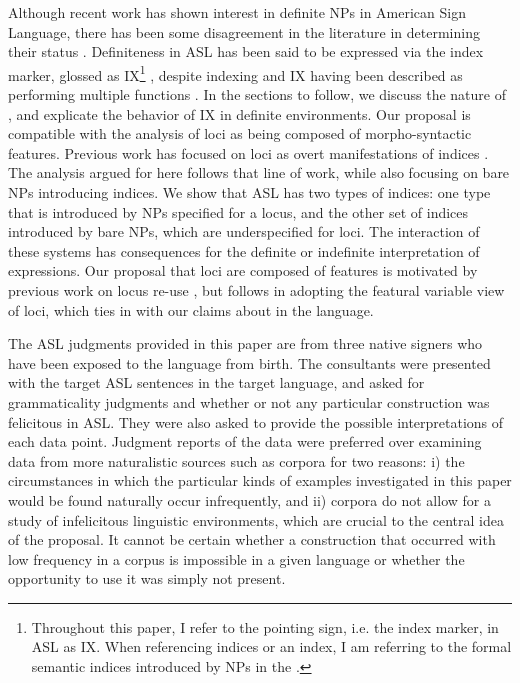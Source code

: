 \documentclass[output=paper,
modfonts
]{langscibook}
\begin{document}
Although recent work has shown interest in definite NPs in American Sign Language, there has been some disagreement in the literature in determining their status \citep{Bahanetal1995,KoulidobrovaLilloMartin2016}. Definiteness in ASL has been said to be expressed via the index marker, glossed as IX\footnote{Throughout this paper, I refer to the pointing sign, i.e. the index marker, in ASL as IX. When referencing indices or an index, I am referring to the formal semantic indices introduced by NPs in the .} \citep{Bahanetal1995}, despite indexing and IX having been described as performing multiple functions \citep[e.g.][]{LilloMartinKlima1990}. In the sections to follow, we discuss the nature of , and explicate the behavior of IX in definite environments. Our proposal is compatible with the analysis of loci as being composed of morpho-syntactic features. Previous work has focused on loci as overt manifestations of indices . The analysis argued for here follows that line of work, while also focusing on bare NPs introducing indices. We show that ASL has two types of indices: one type that is introduced by NPs specified for a locus, and the other set of indices introduced by bare NPs, which are underspecified for loci. The interaction of these systems has consequences for the definite or indefinite interpretation of expressions. Our proposal that loci are composed of features is motivated by previous work on locus re-use \citep{Kuhn2015}, but follows \citet{Schlenker2014} in adopting the featural variable view of loci, which ties in with our claims about  in the language.

The ASL judgments provided in this paper are from three native signers who have been exposed to the language from birth. The consultants were presented with the target ASL sentences in the target language, and asked for grammaticality judgments and whether or not any particular construction was felicitous in ASL. They were also asked to provide the possible interpretations of each data point. Judgment reports of the data were preferred over examining data from more naturalistic sources such as corpora for two reasons: i) the circumstances in which the particular kinds of examples investigated in this paper would be found naturally occur infrequently, and ii) corpora do not allow for a study of infelicitous linguistic environments, which are crucial to the central idea of the proposal. It cannot be certain whether a construction that occurred with low frequency in a corpus is impossible in a given language or whether the opportunity to use it was simply not present.
\end{document}
